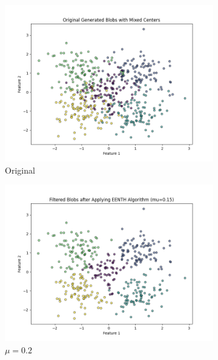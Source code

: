 \begin{figure}[ht]
	\centering
	\begin{subfigure}[b]{0.3\textwidth}
		\centering
		\includegraphics[width=\textwidth]{figures/eenth/original_blobs}
		\caption{Original}
		\label{fig:original}
	\end{subfigure}
	\hfill
	\begin{subfigure}[b]{0.3\textwidth}
		\centering
		\includegraphics[width=\textwidth]{figures/eenth/filtered_blobs_mu_0.15}
		\caption{$\mu = 0.2$}
		\label{fig:mu0.2}
	\end{subfigure}
	\hfill
	\begin{subfigure}[b]{0.3\textwidth}
		\centering

\end{subfigure}
\end{figure}
